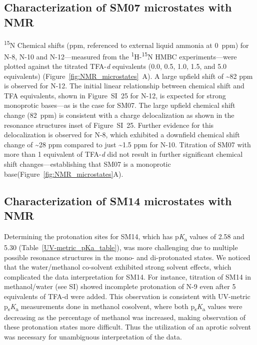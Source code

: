 \documentclass[9pt,lineno]{elife}
\newcommand{\pKa}{p\textit{K}\textsubscript{a}}
\newcommand{\psKa}{p\textsubscript{s}\textit{K}\textsubscript{a}}
\begin{document}
\subsection{Characterization of SM07 microstates with NMR}

\textsuperscript{15}N Chemical shifts (ppm, referenced to external liquid ammonia at 0~ppm) for N-8, N-10 and N-12---measured from the \textsuperscript{1}H-\textsuperscript{15}N HMBC experiments---were plotted against the titrated TFA-\textit{d} equivalents (0.0, 0.5, 1.0, 1.5, and 5.0 equivalents) (Figure~\ref{fig:NMR_microstates}~A). 
A large upfield shift of \textasciitilde82 ppm is observed for N-12. 
The initial linear relationship between chemical shift and TFA equivalents, shown in Figure~SI~25 for N-12, is expected for strong monoprotic bases---as is the case for SM07. 
The large upfield chemical shift change (82~ppm) is consistent with a charge delocalization as shown in the resonance structures inset of Figure~SI~25. 
Further evidence for this delocalization is observed for N-8, which exhibited a downfield chemical shift change of \textasciitilde28 ppm compared to just \textasciitilde1.5 ppm for N-10. 
Titration of SM07 with more than 1 equivalent of TFA-\textit{d} did not result in further significant chemical shift changes---establishing that SM07 is a monoprotic base(Figure~\ref{fig:NMR_microstates}A).

\subsection{Characterization of SM14 microstates with NMR}

Determining the protonation sites for SM14, which has \pKa{} values of 2.58 and 5.30 (Table~\ref{UV-metric_pKa_table}), was more challenging due to multiple possible resonance structures in the mono- and di-protonated states. 
We noticed that the water/methanol co-solvent exhibited strong solvent effects, which complicated the data interpretation for SM14. 
For instance, titration of SM14 in methanol/water (see SI) showed incomplete protonation of N-9 even after 5 equivalents of TFA-d were added. 
This observation is consistent with UV-metric \psKa{} measurements done in methanol cosolvent, where both \psKa{} values were decreasing as the percentage of methanol was increased, making observation of these protonation states more difficult. 
Thus the utilization of an aprotic solvent was necessary for unambiguous interpretation of the data.
\end{document}
